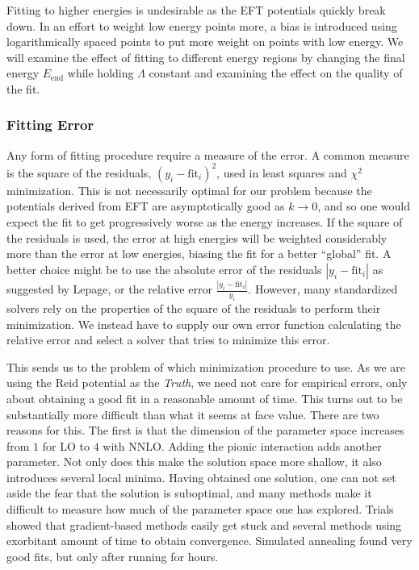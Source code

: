 Fitting to higher energies is undesirable as the EFT potentials quickly break
down. In an effort to weight low energy points more, a bias is introduced using logarithmically spaced points
to put more weight on points with low energy. We will examine the effect of
fitting to different energy regions by changing the final energy
\(E_{\mathrm{end}}\) while holding \(\Lambda\) constant and examining the effect
on the quality of the fit.

\subsubsection{Fitting Error}
Any form of fitting procedure require a measure of the error. A common measure
is the square of the residuals, \(\left( y_{i} - \mathrm{fit}_{i} \right)^{2}\), used
in least squares and \(\chi^{2}\) minimization. This is not necessarily optimal
for our problem because the potentials derived from EFT are asymptotically good
as \(k\to 0\), and so one would expect the fit to get progressively worse as the
energy increases. If the square of the residuals is used, the error at high energies
will be weighted considerably more
than the error at low energies, biasing the fit for a better ``global'' fit. A
better choice might be to use the absolute error of the residuals
\(|y_{i}-\mathrm{fit}_{i}|\) as suggested by Lepage\cite{lepage1997renormalize}, or the relative error
\(\frac{|y_{i}-\mathrm{fit}_{i}|}{y_{i}}\). However, many standardized solvers
rely on the properties of the square of the residuals to perform their
minimization. We instead have to supply our own error function calculating the
relative error and select a
solver that tries to minimize this error.

This sends us to the problem of which minimization procedure to use. As we are
using the Reid potential as the \textit{Truth}, we need not care for empirical errors,
only about obtaining a good fit in a reasonable amount of time. This turns out
to be substantially more difficult than what it seems at face value. There are
two reasons for this. The first is that the dimension of the parameter space increases 
from \(1\) for LO to \(4\) with \(\mathrm{NNLO}\). Adding the pionic interaction
adds another parameter. Not only does this
make the solution space more shallow, it also introduces several
local minima. Having obtained one solution, one can not set aside the fear that
the solution is suboptimal, and many methods make it difficult to measure how
much of the parameter space one has explored. Trials showed that gradient-based
methods easily get stuck and several methods using exorbitant amount of time to
obtain convergence. Simulated annealing found very good fits, but only
after running for hours.

